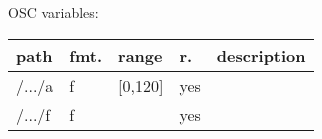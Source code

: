 \begin{snugshade}
{\footnotesize
\label{osctab:tascarappulse}
OSC variables:
\nopagebreak

\begin{tabularx}{\textwidth}{llllX}
\hline
path & fmt. & range & r. & description\\
\hline
/.../a & f & [0,120] & yes & \\
/.../f & f &  & yes & \\
\hline
\end{tabularx}
}
\end{snugshade}
